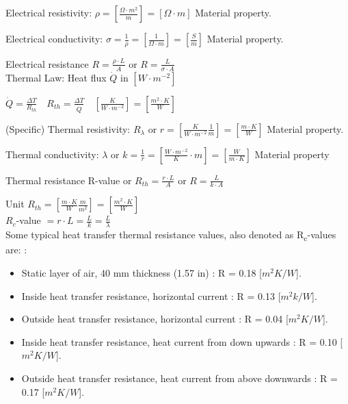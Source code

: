 Electrical resistivity: $ \rho = [\frac{\Omega \cdot m^2}{m} ] = [\Omega \cdot m] $ Material property.

Electrical conductivity: $ \sigma = \frac{1}{\rho} =[\frac{1}{\Omega \cdot m}] = [\frac{S}{m}] $ Material property.

Electrical resistance $ R = \frac{\rho \cdot L}{A} $ or $ R = \frac{L}{\sigma \cdot A} $
\\

Thermal Law: 
Heat flux $ \dot Q $ in $ [W \cdot m^{-2}] $

$ \dot Q = \frac{\Delta T}{R_{th}} \quad R_{th} = \frac{\Delta T}{\dot  Q} 
\quad [\frac{K}{W \cdot m^{-2}}] = [\frac{m^2 \cdot K}{W}]$

(Specific) Thermal resistivity: $ R_\lambda $ or $ r = [\frac{K}{W \cdot m^{-2}} \frac{1}{m} ] = [\frac{m \cdot K}{W}] $ Material property.

Thermal conductivity: $ \lambda $ or $ k  = \frac{1}{r} = [\frac{ W \cdot m^{-2} }{K} \cdot m] 
= [\frac{W}{m \cdot K}] $ Material property

Thermal resistance R-value or $ R_{th} = \frac{r \cdot L}{A} $ or $ R = \frac{L}{k \cdot A} $

Unit $ R_{th} = [\frac{m \cdot K}{W} \frac{m}{m^2}] = [\frac{m^2 \cdot K}{W}] $
\\

$R_c$-value $ = r \cdot L = \frac{L}{k} = \frac{L}{\lambda} $
\\

Some typical heat transfer thermal resistance values, also denoted as R\textsubscript{c}-values are: \cite{OVERALL}: 

\begin{itemize}
	\item Static layer of air, 40 mm thickness (1.57 in)  : R = 0.18 [$m^2K/W$].
	\item Inside heat transfer resistance, horizontal current : R = 0.13 [$m^2k/W$]. 
	\item Outside heat transfer resistance, horizontal current : R = 0.04 [$m^2K/W$].
	\item Inside heat transfer resistance, heat current from down upwards : R = 0.10 [$m^2K/W$].
	\item Outside heat transfer resistance, heat current from above downwards : R = 0.17 [$m^2K/W$].
	
\end{itemize}

